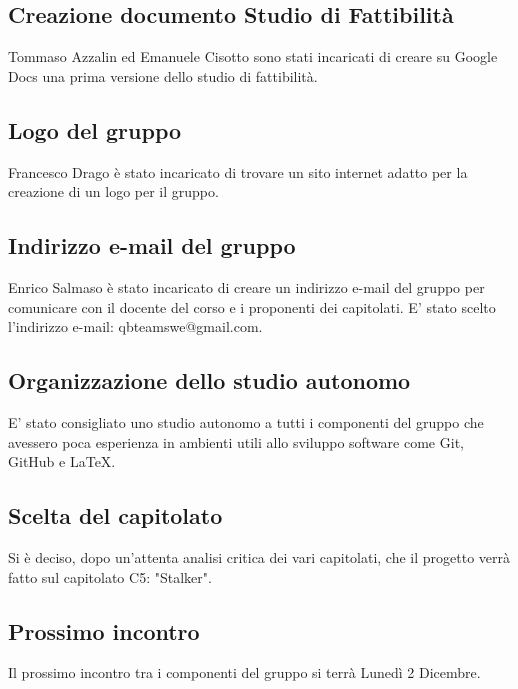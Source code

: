 \subsection{Creazione documento Studio di Fattibilità}
Tommaso Azzalin ed Emanuele Cisotto sono stati incaricati di creare su Google Docs una prima versione dello studio di fattibilità.

\subsection{Logo del gruppo}
Francesco Drago è stato incaricato di trovare un sito internet adatto per la creazione di un logo per il gruppo.

\subsection{Indirizzo e-mail del gruppo}
Enrico Salmaso è stato incaricato di creare un indirizzo e-mail del gruppo per comunicare con il docente del corso e i proponenti dei capitolati.
E' stato scelto l'indirizzo e-mail: qbteamswe@gmail.com.

\subsection{Organizzazione dello studio autonomo}
E' stato consigliato uno studio autonomo a tutti i componenti del gruppo che avessero poca esperienza in ambienti utili allo sviluppo software come Git, GitHub e LaTeX.

\subsection{Scelta del capitolato}
Si è deciso, dopo un'attenta analisi critica dei vari capitolati, che il progetto verrà fatto sul capitolato C5: "Stalker".

\subsection{Prossimo incontro}
Il prossimo incontro tra i componenti del gruppo si terrà Lunedì 2 Dicembre.
\clearpage